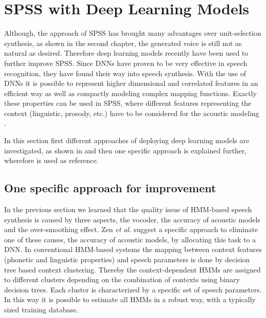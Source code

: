 \section{\ac{SPSS} with Deep Learning Models}
\label{sec:deepspeech}

{\color{ACMRed}Although, the approach of \ac{SPSS} has brought many advantages over unit-selection synthesis, as shown in the second chapter, the generated voice is still not as natural as desired. Therefore deep learning models recently have been used to further improve \ac{SPSS}. Since \acp{DNN} have proven to be very effective in speech recognition, they have found their way into speech synthesis. With the use of \acp{DNN} it is possible to represent higher dimensional and correlated features in an efficient way as well as compactly modeling complex mapping functions. Exactly these properties can be used in \ac{SPSS}, where different features representing the context (linguistic, prosody, etc.) have to be considered for the acoustic modeling \cite{hashimoto:effect}.}

{\color{ACMRed}In this section first different approaches of deploying deep learning models are investigated, as shown in \cite{hashimoto:effect} and then one specific approach is explained further, wherefore \cite{zen:deepstatistical} is used as reference.}

\subsection{One specific approach for improvement}
\label{subsec:deepspss}

In the previous section we learned that the quality issue of \ac{HMM}-based speech synthesis is caused by three aspects, the vocoder, the accuracy of acoustic models and the over-smoothing effect. Zen \textit{et al.} \cite{zen:deepstatistical} suggest a specific approach to eliminate one of these causes, the accuracy of acoustic models, by allocating this task to a \ac{DNN}. In conventional \ac{HMM}-based systems the mapping between context features (phonetic and linguistic properties) and speech parameters is done by decision tree based context clustering. Thereby the context-dependent \acp{HMM} are assigned to different clusters depending on the combination of contexts using binary decision trees. Each cluster is characterized by a specific set of speech parameters. In this way it is possible to estimate all \acp{HMM} in a robust way, with a typically sized training database.

